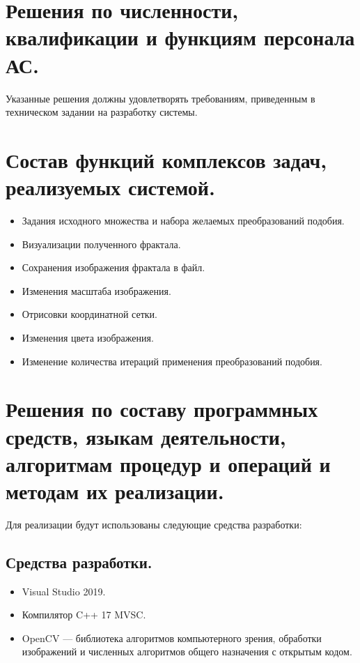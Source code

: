 \documentclass[a4paper,12pt,preview]{report} %
\begin{document}
	\section{Решения по численности, квалификации и функциям персонала АС.}
	
	Указанные решения должны удовлетворять требованиям, приведенным в техническом задании на разработку системы.
	
	\section{Состав функций комплексов задач, реализуемых системой.}
	
	
	\begin{itemize}
		\item Задания исходного множества и набора желаемых преобразований подобия.
		\item Визуализации полученного фрактала.
		\item Сохранения изображения фрактала в файл.
		\item Изменения масштаба изображения.
		\item Отрисовки координатной сетки.
		\item Изменения цвета изображения.
		\item Изменение количества итераций применения преобразований подобия.
	\end{itemize}
	
	\section{Решения по составу программных средств, языкам деятельности, алгоритмам процедур и операций и методам их реализации.}
	
	Для реализации будут использованы следующие средства разработки:
	
	\subsection{Средства разработки.}
		
		\begin{itemize}
			\item Visual Studio 2019.
			
			\item Компилятор C++ 17 MVSC.
			
			\item OpenCV — библиотека алгоритмов компьютерного зрения, обработки изображений и численных алгоритмов общего назначения с открытым кодом.
			
		\end{itemize}
		
\end{document}
